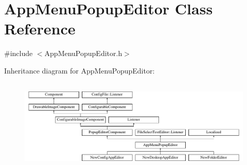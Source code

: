 \hypertarget{classAppMenuPopupEditor}{}\section{App\+Menu\+Popup\+Editor Class Reference}
\label{classAppMenuPopupEditor}


{\ttfamily \#include $<$App\+Menu\+Popup\+Editor.\+h$>$}

Inheritance diagram for App\+Menu\+Popup\+Editor\+:\begin{figure}[H]
\begin{center}
\leavevmode
\includegraphics[height=4.444445cm]{classAppMenuPopupEditor}
\end{center}
\end{figure}
